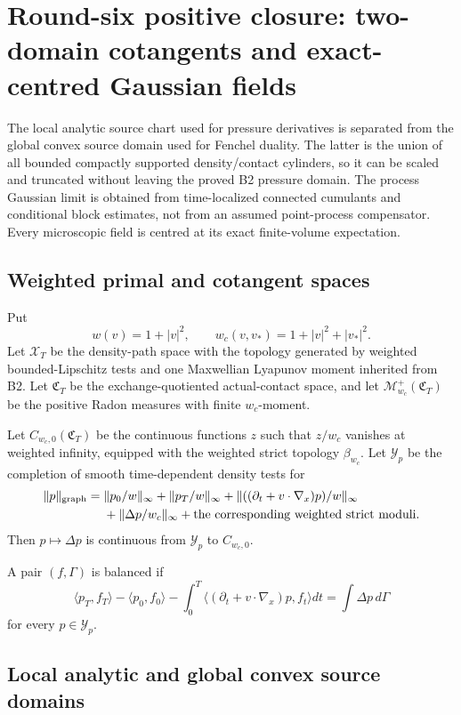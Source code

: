 \section{Round-six positive closure: two-domain cotangents and exact-centred Gaussian fields}
\label{sec:r6-b3}

The local analytic source chart used for pressure derivatives is separated
from the global convex source domain used for Fenchel duality.  The latter is
the union of all bounded compactly supported density/contact cylinders, so it
can be scaled and truncated without leaving the proved B2 pressure domain.
The process Gaussian limit is obtained from time-localized connected
cumulants and conditional block estimates, not from an assumed point-process
compensator.  Every microscopic field is centred at its exact finite-volume
expectation.

\subsection{Weighted primal and cotangent spaces}

Put
\[
w(v)=1+|v|^2,
\qquad
w_c(v,v_*)=1+|v|^2+|v_*|^2.
\]
Let \(\mathcal X_T\) be the density-path space with the topology generated by
weighted bounded-Lipschitz tests and one Maxwellian Lyapunov moment inherited
from B2.  Let \(\mathfrak C_T\) be the exchange-quotiented actual-contact
space, and let \(\mathcal M_{w_c}^+(\mathfrak C_T)\) be the positive Radon
measures with finite \(w_c\)-moment.

Let \(C_{w_c,0}(\mathfrak C_T)\) be the continuous functions \(z\) such that
\(z/w_c\) vanishes at weighted infinity, equipped with the weighted strict
topology \(\beta_{w_c}\).  Let \(\mathcal Y_p\) be the completion of smooth
time-dependent density tests for
\[
\begin{aligned}
\|p\|_{\rm graph}={}&
\|p_0/w\|_\infty+\|p_T/w\|_\infty
+\|((\partial_t+v\cdot\nabla_x)p)/w\|_\infty\\
&+\|\Delta p/w_c\|_\infty
+\text{the corresponding weighted strict moduli}.
\end{aligned}
\]
Then \(p\mapsto\Delta p\) is continuous from \(\mathcal Y_p\) to
\(C_{w_c,0}\).

A pair \((f,\Gamma)\) is balanced if
\[
\langle p_T,f_T\rangle-
\langle p_0,f_0\rangle-
\int_0^T\langle(\partial_t+v\cdot\nabla_x)p,f_t\rangle dt
=\int\Delta p\,d\Gamma
\]
for every \(p\in\mathcal Y_p\).

\subsection{Local analytic and global convex source domains}

